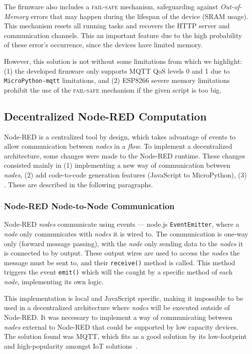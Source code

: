 The firmware also includes a \textsc{fail-safe} mechanism, safeguarding against \textit{Out-of-Memory} errors that may happen during the lifespan of the device (SRAM usage). This mechanism resets all running tasks and recovers the HTTP server and communication channels. This an important feature due to the high probability of these error's occurrence, since the devices have limited memory. 

However, this solution is not without some limitations from which we highlight: (1) the developed firmware only supports MQTT QoS levels 0 and 1 due to \texttt{MicroPython-mqtt} limitations, and (2) ESP8266 severe memory limitations prohibit the use of the \textsc{fail-safe} mechanism if the given script is too big.

\subsection{Decentralized Node-RED Computation}\label{sec:node_red_decentralization}

Node-RED is a centralized tool by design, which takes advantage of events to allow communication between \textit{nodes} in a \textit{flow}. To implement a decentralized architecture, some changes were made to the Node-RED runtime. These changes consisted mainly in (1) implementing a new way of communication between \textit{nodes}, (2) add code-to-code generation features (\ie JavaScript to MicroPython), (3) . These are described in the following paragraphs.

\subsubsection{Node-RED Node-to-Node Communication}\label{sec:mqtt_support}

Node-RED \textit{nodes} communicate using events --- node.js \texttt{EventEmitter}, where a \textit{node} only communicates with \textit{nodes} it is wired to. The communication is one-way only (forward message passing), with the \textit{node} only sending data to the \textit{nodes} it is connected to by output. These output wires are used to access the \textit{nodes} the message must be sent to, and their \texttt{receive()} method is called. This method triggers the event \texttt{emit()} which will the caught by a specific method of each \textit{node}, implementing its own logic.

This implementation is local and JavaScript specific, making it impossible to be used in a decentralized architecture where \textit{nodes} will be executed outside of Node-RED. It was necessary to implement a way of communicating between \textit{nodes} external to Node-RED that could be supported by low capacity devices. The solution found was MQTT, which fits as a good solution by its low-footprint and high-popularity amongst IoT solutions~\cite{soni2017survey}.

